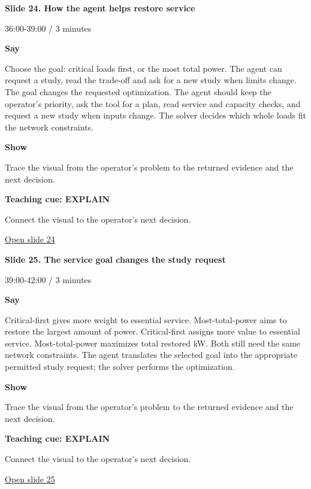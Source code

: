 \documentclass[12pt,letterpaper]{article}
\begin{document}
{\Large\bfseries\color{IEEEBlue} Slide 24. How the agent helps restore service\par}\medskip
{\small\color{Slate} 36:00-39:00 /\allowbreak{} 3 minutes\par}\medskip
\textbf{Say}\par Choose the goal: critical loads first, or the most total power. The agent can request a study, read the trade-off and ask for a new study when limits change. The goal changes the requested optimization. The agent should keep the operator's priority, ask the tool for a plan, read service and capacity checks, and request a new study when inputs change. The solver decides which whole loads fit the network constraints.\par\medskip
\textbf{Show}\par Trace the visual from the operator's problem to the returned evidence and the next decision.\par\medskip
\textbf{Teaching cue: EXPLAIN}\par Connect the visual to the operator's next decision.\par\medskip
\vfill\href{https://alaaselim-sudo.github.io/GridGuard-Agentic-AI-Tutorials/operator-cases/#/24}{Open slide 24}\par
\clearpage{}
{\Large\bfseries\color{IEEEBlue} Slide 25. The service goal changes the study request\par}\medskip
{\small\color{Slate} 39:00-42:00 /\allowbreak{} 3 minutes\par}\medskip
\textbf{Say}\par Critical-first gives more weight to essential service. Most-total-power aims to restore the largest amount of power. Critical-first assigns more value to essential service. Most-total-power maximizes total restored kW. Both still need the same network constraints. The agent translates the selected goal into the appropriate permitted study request; the solver performs the optimization.\par\medskip
\textbf{Show}\par Trace the visual from the operator's problem to the returned evidence and the next decision.\par\medskip
\textbf{Teaching cue: EXPLAIN}\par Connect the visual to the operator's next decision.\par\medskip
\vfill\href{https://alaaselim-sudo.github.io/GridGuard-Agentic-AI-Tutorials/operator-cases/#/25}{Open slide 25}\par
\end{document}
